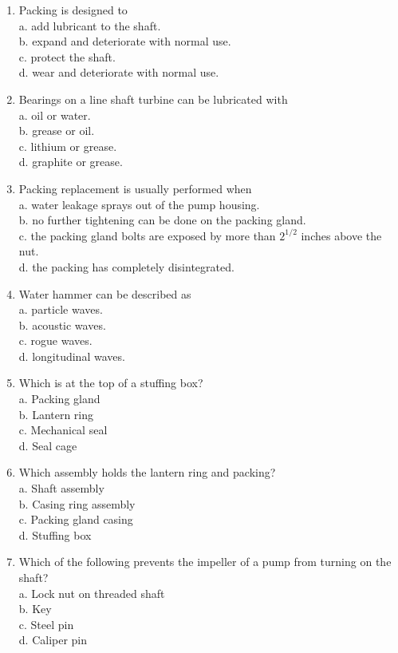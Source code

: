 \begin{enumerate}[1.]
  \item Packing is designed to\\
a. add lubricant to the shaft.\\
b. expand and deteriorate with normal use.\\
c. protect the shaft.\\
d. wear and deteriorate with normal use.

  \item Bearings on a line shaft turbine can be lubricated with\\
a. oil or water.\\
b. grease or oil.\\
c. lithium or grease.\\
d. graphite or grease.

  \item Packing replacement is usually performed when\\
a. water leakage sprays out of the pump housing.\\
b. no further tightening can be done on the packing gland.\\
c. the packing gland bolts are exposed by more than $2^{1 / 2}$ inches above the nut.\\
d. the packing has completely disintegrated. 

  \item Water hammer can be described as\\
a. particle waves.\\
b. acoustic waves.\\
c. rogue waves.\\
d. longitudinal waves.

  \item Which is at the top of a stuffing box?\\
a. Packing gland\\
b. Lantern ring\\
c. Mechanical seal\\
d. Seal cage 

  \item Which assembly holds the lantern ring and packing?\\
a. Shaft assembly\\
b. Casing ring assembly\\
c. Packing gland casing\\
d. Stuffing box

  \item Which of the following prevents the impeller of a pump from turning on the shaft?\\
a. Lock nut on threaded shaft\\
b. Key\\
c. Steel pin\\
d. Caliper pin


\end{enumerate}
